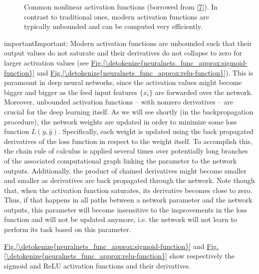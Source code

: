 \documentclass[letterpaper,10pt,english]{jupyterBook}
\let\sphinxpxdimen\pdfpxdimen\else\newdimen\sphinxpxdimen
\begin{document}
\begin{figure}
\centering
\noindent\sphinxincludegraphics[height=480\sphinxpxdimen]{{activation_functions}.png}
\caption{Common non\sphinxhyphen{}linear activation functions (borrowed from {[}\hyperlink{cite.bibliography:id18}{7}{]}). In contrast to traditional ones, modern activation functions are typically unbounded and can be computed very efficiently.}\label{\detokenize{neuralnets_func_approx:activation-functions}}\end{figure}

\begin{sphinxadmonition}{important}{Important:}
\sphinxAtStartPar
Modern activation functions are unbounded such that their output values do not saturate and their derivatives do not collapse to zero for larger activation values (see \hyperref[\detokenize{neuralnets_func_approx:sigmoid-function}]{Fig.\@ \ref{\detokenize{neuralnets_func_approx:sigmoid-function}}} and \hyperref[\detokenize{neuralnets_func_approx:relu-function}]{Fig.\@ \ref{\detokenize{neuralnets_func_approx:relu-function}}}). This is paramount in deep neural networks, since the activation values might become bigger and bigger as the feed input features \( \lbrace x_{i} \rbrace \) are forwarded over the network. Moreover, unbounded activation functions – with non\sphinxhyphen{}zero derivatives – are crucial for the deep learning itself. As we will see shortly (in the backpropagation procedure), the network weights are updated in order to minimize some loss function \( L(y,\hat{y}) \). Specifically, each weight is updated using the back propagated derivatives of the loss function in respect to the weight itself. To accomplish this, the chain rule of calculus is applied several times over potentially long branches of the associated computational graph linking the parameter to the network outputs. Additionally, the product of chained derivatives might become smaller and smaller as derivatives are back propagated through the network. Note though that, when the activation function saturates, its derivative becomes close to zero. Thus, if that happens in all paths between a network parameter and the network outputs, this parameter will become insensitive to the improvements in the loss function and will not be updated anymore, i.e. the network will not learn to perform its task based on this parameter.

\sphinxAtStartPar
\hyperref[\detokenize{neuralnets_func_approx:sigmoid-function}]{Fig.\@ \ref{\detokenize{neuralnets_func_approx:sigmoid-function}}} and \hyperref[\detokenize{neuralnets_func_approx:relu-function}]{Fig.\@ \ref{\detokenize{neuralnets_func_approx:relu-function}}} show respectively the sigmoid and ReLU activation functions and their derivatives.



\end{sphinxadmonition}
\end{document}
